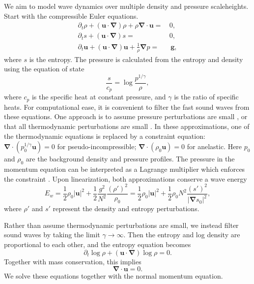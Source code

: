 \documentclass[
        fleqn,
        usenatbib,
    ]{mnras}
\newcommand*{\abs}[1]{\left|#1\right|}
\newcommand*{\p}[1]{\left(#1\right)}
\newcommand*{\bm}[1]{\mathbf{#1}}
\begin{document}
We aim to model wave dynamics over multiple density and pressure scaleheights.
Start with the compressible Euler equations.
\begin{align}
    \partial_t \rho + \p{\bm{u}\cdot\bm{\nabla}} \rho
            + \rho \bm{\nabla}\cdot\bm{u} =\, &0, \\
    \partial_t s + \p{\bm{u}\cdot\bm{\nabla}} s =\, &0, \\
    \partial_t \bm{u} + \p{\bm{u}\cdot\bm{\nabla}}\bm{u} +
        \frac{1}{\rho}\bm{\nabla} p =& \, \bm{g},
\end{align}
where $s$ is the entropy. The pressure is calculated from the entropy and
density using the equation of state
\begin{equation}
    \frac{s}{c_p} = \log \frac{p^{1/\gamma}}{\rho},
\end{equation}
where $c_p$ is the specific heat at constant pressure, and $\gamma$ is the ratio
of specific heats. For computational ease, it is convenient to filter the fast
sound waves from these equations. One approach is to assume pressure
perturbations are small \citep[yielding the ``pseudo-incompressible''
equations,][]{anel_part2}, or that all thermodynamic perturbations are small
\citep[yielding the ``anelastic'' equations,][]{anel_part1}. In these
approximations, one of the thermodynamic equations is replaced by a constraint
equation: $\bm{\nabla}\cdot \p{p_0^{1/\gamma} \bm{u}}=0$ for
pseudo-incompressible; $\bm{\nabla}\cdot\p{\rho_0 \bm{u}} =0$ for anelastic.
Here $p_0$ and $\rho_0$ are the background density and pressure profiles. The
pressure in the momentum equation can be interpreted as a Lagrange multiplier
which enforces the constraint \citep{anel_part2}. Upon linearization, both
approximations conserve a wave energy
\begin{equation}
    E_w = \frac{1}{2}\rho_0 \abs{\bm{u}}^2
            + \frac{1}{2}\frac{g^2}{N^2} \frac{(\rho')^2}{\rho_0}
        = \frac{1}{2}\rho_0 \abs{\bm{u}}^2
            + \frac{1}{2}\rho_0 N^2 \frac{(s')^2}{\abs{\bm{\nabla} s_0}^2},
            \label{eq:ewave}
\end{equation}
where $\rho'$ and $s'$ represent the density and entropy perturbations.

Rather than assume thermodynamic perturbations are small, we instead filter
sound waves by taking the limit $\gamma\rightarrow \infty$. Then the entropy and
log density are proportional to each other, and the entropy equation becomes
\begin{equation}
    \partial_t \log \rho + \p{\bm{u}\cdot \bm{\nabla}} \log \rho = 0.
\end{equation}
Together with mass conservation, this implies
\begin{equation}
    \bm{\nabla} \cdot \bm{u} = 0.
\end{equation}
We solve these equations together with the normal momentum equation.
\end{document}
